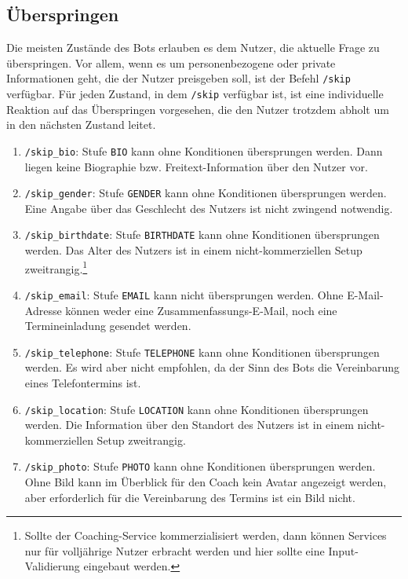         \subsection{Überspringen} \label{Realisierung: skip}
            Die meisten Zustände des Bots erlauben es dem Nutzer, die aktuelle Frage zu überspringen. Vor allem, wenn es um personenbezogene oder private Informationen geht, die der Nutzer preisgeben soll, ist der Befehl \verb|/skip| verfügbar. Für jeden Zustand, in dem \verb|/skip| verfügbar ist, ist eine individuelle Reaktion auf das Überspringen vorgesehen, die den Nutzer trotzdem abholt um in den nächsten Zustand leitet. 
            \begin{enumerate}
                \item \verb|/skip_bio|: Stufe \verb|BIO| kann ohne Konditionen übersprungen werden. Dann liegen keine Biographie bzw. Freitext-Information über den Nutzer vor.
                \item \verb|/skip_gender|: Stufe \verb|GENDER| kann ohne Konditionen übersprungen werden. Eine Angabe über das Geschlecht des Nutzers ist nicht zwingend notwendig.
                \item \verb|/skip_birthdate|: Stufe \verb|BIRTHDATE| kann ohne Konditionen übersprungen werden. Das Alter des Nutzers ist in einem nicht-kommerziellen Setup zweitrangig.\footnote{Sollte der Coaching-Service kommerzialisiert werden, dann können Services nur für volljährige Nutzer erbracht werden und hier sollte eine Input-Validierung eingebaut werden.}
                \item \verb|/skip_email|: Stufe \verb|EMAIL| kann nicht übersprungen werden. Ohne E-Mail-Adresse können weder eine Zusammenfassungs-E-Mail, noch eine Termineinladung gesendet werden.
                \item \verb|/skip_telephone|: Stufe \verb|TELEPHONE| kann ohne Konditionen übersprungen werden. Es wird aber nicht empfohlen, da der Sinn des Bots die Vereinbarung eines Telefontermins ist.
                \item \verb|/skip_location|: Stufe \verb|LOCATION| kann ohne Konditionen übersprungen werden. Die Information über den Standort des Nutzers ist in einem nicht-kommerziellen Setup zweitrangig. 
                \item \verb|/skip_photo|: Stufe \verb|PHOTO| kann ohne Konditionen übersprungen werden. Ohne Bild kann im Überblick für den Coach kein Avatar angezeigt werden, aber erforderlich für die Vereinbarung des Termins ist ein Bild nicht.
            \end{enumerate}
            
